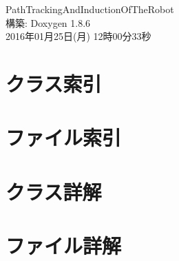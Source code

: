 \documentclass[twoside]{book}
\newcommand{\clearemptydoublepage}{%
  \newpage{\pagestyle{empty}\cleardoublepage}%
}
\begin{document}
\begin{titlepage}
\vspace*{7cm}
\begin{center}%
{\Large Path\-Tracking\-And\-Induction\-Of\-The\-Robot }\\
\vspace*{1cm}
{\large 構築\-: Doxygen 1.8.6}\\
\vspace*{0.5cm}
{\small 2016年01月25日(月) 12時00分33秒}\\
\end{center}
\end{titlepage}
\clearemptydoublepage
\tableofcontents
\clearemptydoublepage
{}

\chapter{クラス索引}

\chapter{ファイル索引}

\chapter{クラス詳解}













\chapter{ファイル詳解}




















\newpage
{}
{}
\printindex
\end{document}
